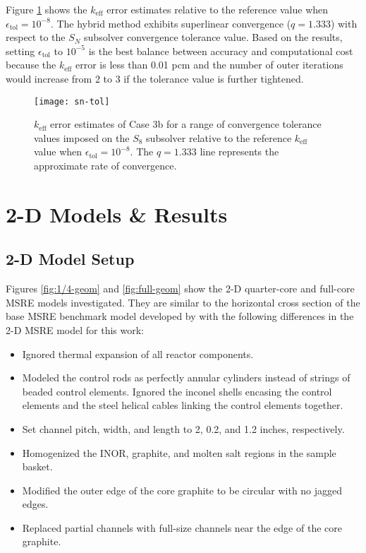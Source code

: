 Figure \ref{fig:sn-tol} shows the $k_\text{eff}$ error estimates relative to the reference value
when $\epsilon_\text{tol}=10^{-8}$. The hybrid method exhibits superlinear convergence ($q=1.333$)
with respect to the $S_N$ subsolver convergence tolerance value. Based on the results, setting
$\epsilon_\text{tol}$ to $10^{-5}$ is the best balance between accuracy and computational
cost because the $k_\text{eff}$ error is less than 0.01 pcm and the number of outer iterations
would increase from 2 to 3 if the tolerance value is further tightened.

\begin{figure}[htb!]
  \centering
  \texttt{[image: sn-tol]}
  \caption{$k_\text{eff}$ error estimates of Case 3b for a range of convergence tolerance values
  imposed on the $S_8$ subsolver relative to the reference $k_\text{eff}$ value when
  $\epsilon_\text{tol}=10^{-8}$. The $q=1.333$ line represents the approximate rate of
  convergence.}
  \label{fig:sn-tol}
\end{figure}

\section{2-D Models \& Results}

\subsection{2-D Model Setup}

Figures \ref{fig:1/4-geom} and \ref{fig:full-geom} show the 2-D quarter-core and full-core
\gls{MSRE} models investigated. They are similar to the horizontal cross section of the base
\gls{MSRE} benchmark model developed by \cite{fratoni_molten_2020} with the following differences
in the 2-D \gls{MSRE} model for this work:

\begin{itemize}
  \item Ignored thermal expansion of all reactor components.
  \item Modeled the control rods as perfectly annular cylinders instead of strings of beaded
    control elements. Ignored the inconel shells encasing the control elements and the steel
    helical cables linking the control elements together.
  \item Set channel pitch, width, and length to 2, 0.2, and 1.2 inches, respectively.
  \item Homogenized the INOR, graphite, and molten salt regions in the sample basket.
  \item Modified the outer edge of the core graphite to be circular with no jagged edges.
  \item Replaced partial channels with full-size channels near the edge of the core graphite.
\end{itemize}

